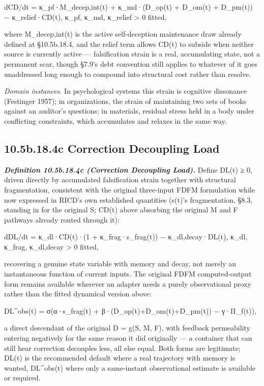 \documentclass[
]{article}
\begin{document}
dCD/dt = κ\_pf·M\_decep,int(t) + κ\_md·(D\_op(t) + D\_om(t) + D\_pm(t))
− κ\_relief·CD(t), κ\_pf, κ\_md, κ\_relief \textgreater{} 0 fitted,

where M\_decep,int(t) is the active self-deception maintenance draw
already defined at §10.5b.18.4, and the relief term allows CD(t) to
subside when neither source is currently active --- falsification strain
is a real, accumulating state, not a permanent scar, though §7.9's debt
convention still applies to whatever of it goes unaddressed long enough
to compound into structural cost rather than resolve.

\emph{Domain instances.} In psychological systems this strain is
cognitive dissonance (Festinger 1957); in organizations, the strain of
maintaining two sets of books against an auditor's questions; in
materials, residual stress held in a body under conflicting constraints,
which accumulates and relaxes in the same way.

\hypertarget{b.18.4c-correction-decoupling-load}{%
\subsection{10.5b.18.4c Correction Decoupling
Load}\label{b.18.4c-correction-decoupling-load}}

\emph{\textbf{Definition 10.5b.18.4c (Correction Decoupling Load).}}
Define DL(t) ≥ 0, driven directly by accumulated falsification strain
together with structural fragmentation, consistent with the original
three-input FDFM formulation while now expressed in RICD's own
established quantities (s(t)'s fragmentation, §8.3, standing in for the
original S; CD(t) above absorbing the original M and F pathways already
routed through it):

dDL/dt = κ\_dl·CD(t)·(1 + κ\_frag·s\_frag(t)) − κ\_dl,decay·DL(t),
κ\_dl, κ\_frag, κ\_dl,decay \textgreater{} 0 fitted,

recovering a genuine state variable with memory and decay, not merely an
instantaneous function of current inputs. The original FDFM
computed-output form remains available wherever an adapter needs a
purely observational proxy rather than the fitted dynamical version
above:

DL\^{}obs(t) = σ(α·s\_frag(t) + β·(D\_op(t)+D\_om(t)+D\_pm(t)) −
γ·Π\_f(t)),

a direct descendant of the original D = g(S, M, F), with feedback
permeability entering negatively for the same reason it did originally
--- a container that can still hear correction decouples less, all else
equal. Both forms are legitimate; DL(t) is the recommended default where
a real trajectory with memory is wanted, DL\^{}obs(t) where only a
same-instant observational estimate is available or required.
\end{document}
